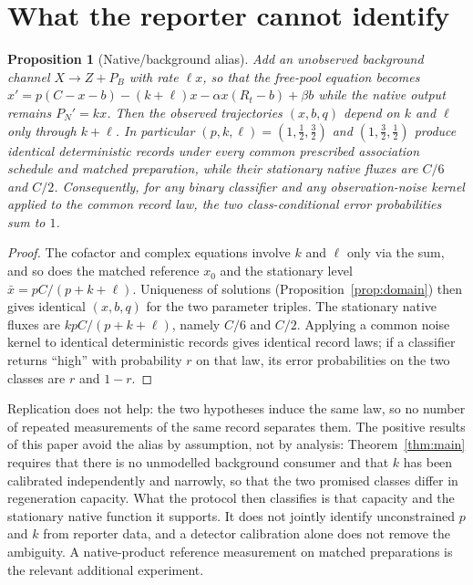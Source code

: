 \documentclass[11pt]{article}
\newtheorem{proposition}[theorem]{Proposition}
\theoremstyle{definition}
\theoremstyle{remark}
\newcommand{\xb}{\bar{x}}
\begin{document}
\section{What the reporter cannot identify}
\label{sec:alias}

\begin{proposition}[Native/background alias]\label{prop:alias}
Add an unobserved background channel $X\to Z+P_B$ with rate $\ell x$, so that the
free-pool equation becomes
$x'=p(C-x-b)-(k+\ell)x-\alpha x(R_t-b)+\beta b$ while the native output remains
$P_N'=kx$. Then the observed trajectories $(x,b,q)$ depend on $k$ and $\ell$
only through $k+\ell$. In particular $(p,k,\ell)=(1,\tfrac12,\tfrac32)$ and
$(1,\tfrac32,\tfrac12)$ produce identical deterministic records under every
common prescribed association schedule and matched preparation, while their
stationary native fluxes are $C/6$ and $C/2$. Consequently, for any binary
classifier and any observation-noise kernel applied to the common record law,
the two class-conditional error probabilities sum to $1$.
\end{proposition}

\begin{proof}
The cofactor and complex equations involve $k$ and $\ell$ only via the sum, and
so does the matched reference $x_0$ and the stationary level $\xb=pC/(p+k+\ell)$.
Uniqueness of solutions (Proposition~\ref{prop:domain}) then gives identical
$(x,b,q)$ for the two parameter triples. The stationary native fluxes are
$kpC/(p+k+\ell)$, namely $C/6$ and $C/2$. Applying a common noise kernel to
identical deterministic records gives identical record laws; if a classifier
returns ``high'' with probability $r$ on that law, its error probabilities on the
two classes are $r$ and $1-r$.
\end{proof}

Replication does not help: the two hypotheses induce the same law, so no number
of repeated measurements of the same record separates them. The positive results
of this paper avoid the alias by assumption, not by analysis: Theorem~\ref{thm:main}
requires that there is no unmodelled background consumer and that $k$ has been
calibrated independently and narrowly, so that the two promised classes differ in
regeneration capacity. What the protocol then classifies is that capacity and the
stationary native function it supports. It does not jointly identify
unconstrained $p$ and $k$ from reporter data, and a detector calibration alone
does not remove the ambiguity. A native-product reference measurement on matched
preparations is the relevant additional experiment.
\end{document}
